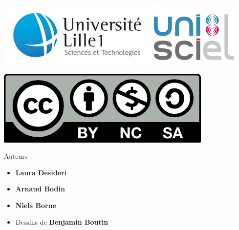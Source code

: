 







\begin{frame}

\thispagestyle{empty}    

  \hspace*{-20ex}
  \begin{minipage}{0.6\textwidth}
  \begin{center}
    \vspace*{5ex}   


    \bigskip

    \includegraphics[scale=0.3]{../divers/logotypeLille1-QUADRI-ECRAN.jpg}
    \quad
    \includegraphics[scale=0.3]{../divers/logo-unisciel.png}

    \vspace*{5ex}

    \includegraphics[scale=0.5]{../divers/by-nc-sa.png}
  \end{center}
  \end{minipage}
  \hfil
  \begin{minipage}{0.50\textwidth}
  \vspace*{5ex}
  Auteurs
  \begin{itemize}
    \item {\bf Laura Desideri}  
    \item {\bf Arnaud Bodin}
    \item {\bf Niels Borne}
    \item Dessins de {\bf \small Benjamin Boutin}
  \end{itemize}


\end{minipage}
\end{frame}
